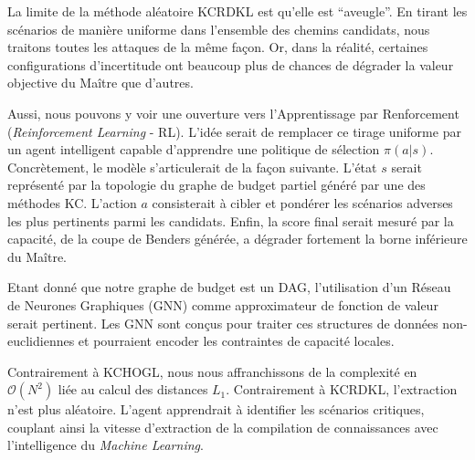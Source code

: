 \documentclass[11pt,a4paper]{article}
\begin{document}
La limite de la méthode aléatoire KCRDKL est qu'elle est \enquote{aveugle}. En tirant les scénarios de manière uniforme dans l'ensemble des chemins candidats, nous traitons toutes les attaques de la même façon. Or, dans la réalité, certaines configurations d'incertitude ont beaucoup plus de chances de dégrader la valeur objective  du Maître que d'autres.

Aussi, nous pouvons y voir une ouverture vers l'Apprentissage par Renforcement (\textit{Reinforcement Learning} - RL). L'idée serait de remplacer ce tirage uniforme par un agent intelligent capable d'apprendre une politique de sélection $\pi(a|s)$. Concrètement, le modèle s'articulerait de la façon suivante. L'état $s$ serait représenté par la topologie du graphe de budget partiel généré par une des méthodes KC. L'action $a$ consisterait à cibler et pondérer les scénarios adverses les plus pertinents parmi les candidats. Enfin, la score final serait mesuré par la capacité, de la coupe de Benders générée, a dégrader fortement la borne inférieure du Maître.

Etant donné que notre graphe de budget est un DAG, l'utilisation d'un Réseau de Neurones Graphiques (GNN) comme approximateur de fonction de valeur serait pertinent. Les GNN sont conçus pour traiter ces structures de données non-euclidiennes et pourraient encoder les contraintes de capacité locales.

Contrairement à KCHOGL, nous nous affranchissons de la complexité en $\mathcal{O}(N^2)$ liée au calcul des distances $L_1$. Contrairement à KCRDKL, l'extraction n'est plus aléatoire. L'agent apprendrait à identifier les scénarios critiques, couplant ainsi la vitesse d'extraction de la compilation de connaissances avec l'intelligence du \textit{Machine Learning}.

\printbibliography
\end{document}
